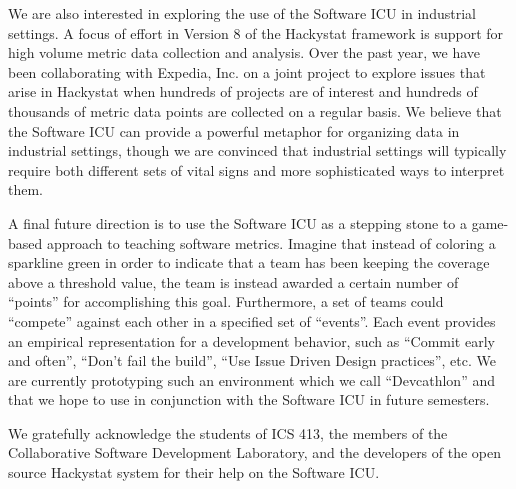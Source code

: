 \documentclass[10pt,twocolumn]{article}
\begin{document}
We are also interested in exploring the use of the Software ICU in
industrial settings.  A focus of effort in Version 8 of the Hackystat
framework is support for high volume metric data collection and
analysis.  Over the past year, we have been collaborating with Expedia,
Inc. on a joint project to explore issues that arise in Hackystat when
hundreds of projects are of interest and hundreds of thousands of metric
data points are collected on a regular basis.  We believe that the Software
ICU can provide a powerful metaphor for organizing data in industrial
settings, though we are convinced that industrial settings will typically
require both different sets of vital signs and more sophisticated ways to
interpret them.

A final future direction is to use the Software ICU as a stepping stone to
a game-based approach to teaching software metrics.  Imagine that instead
of coloring a sparkline green in order to indicate that a team has been
keeping the coverage above a threshold value, the team is instead awarded
a certain number of ``points'' for accomplishing this goal.  Furthermore,
a set of teams could ``compete'' against each other in a specified set of
``events''.  Each event provides an empirical representation for a
development behavior, such as ``Commit early and often'', ``Don't fail the
build'', ``Use Issue Driven Design practices'', etc.  We are currently
prototyping such an environment which we call ``Devcathlon'' and that we
hope to use in conjunction with the Software ICU in future semesters.


We gratefully acknowledge the students of ICS 413, the members of the Collaborative Software Development Laboratory, and
the developers of the open source Hackystat system for their help on the Software ICU.


  
\end{document}

